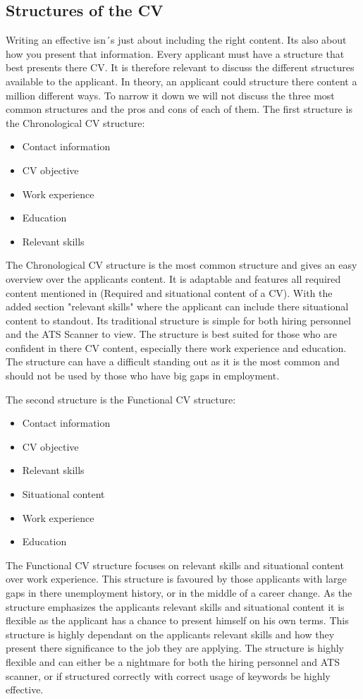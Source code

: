 \subsection{Structures of the CV}
Writing an effective isn´s just about including the right content. 
Its also about how you present that information.
Every applicant must have a structure that best presents there CV.
It is therefore relevant to discuss the different structures available to the applicant. 
In theory, an applicant could structure there content a million different ways.
To narrow it down we will not discuss the three most common structures and the pros and cons of each of them.
The first structure is the Chronological CV structure:
\begin{itemize}
   \item  Contact information
   \item  CV objective
   \item  Work experience
   \item  Education
   \item  Relevant skills
   \end{itemize}
The Chronological CV structure is the most common structure and gives an easy overview over the applicants content.
It is adaptable and features all required content mentioned in (Required and situational content of a CV).
With the added section "relevant skills" where the applicant can include there situational content to standout.
Its traditional structure is simple for both hiring personnel and the ATS Scanner to view.
The structure is best suited for those who are confident in there CV content, especially there work experience and education.
The structure can have a difficult standing out as it is the most common and should not be used by those who have big gaps in employment.

The second structure is the Functional CV structure:
\begin{itemize}
   \item  Contact information
   \item  CV objective
   \item  Relevant skills
   \item  Situational content
   \item  Work experience
   \item  Education
   \end{itemize}
The Functional CV structure focuses on relevant skills and situational content over work experience.
This structure is favoured by those applicants with large gaps in there unemployment history, or in the middle of a career change.
As the structure emphasizes the applicants relevant skills and situational content it is flexible as the applicant has a chance to present himself on his own terms.
This structure is highly dependant on the applicants relevant skills and how they present there significance to the job they are applying.
The structure is highly flexible and can either be a nightmare for both the hiring personnel and ATS scanner, or if structured correctly with correct usage of keywords be highly effective.


